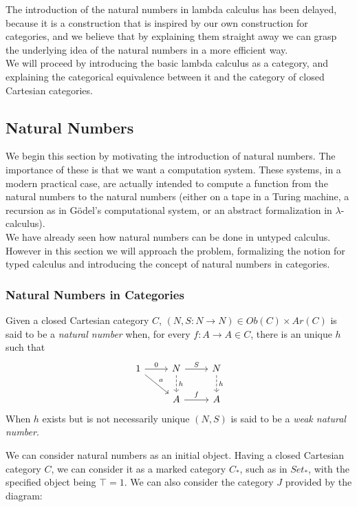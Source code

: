 The introduction of the natural numbers in lambda calculus has been delayed, because it is a construction that is inspired by our own construction for categories, and we believe that by explaining them straight away we can grasp the underlying idea of the natural numbers in a more efficient way.\\

We will proceed by introducing the basic lambda calculus as a category, and explaining the categorical equivalence between it and the category of closed Cartesian categories.

\subsection{Natural Numbers}


We begin this section by motivating the introduction of natural numbers. The importance of these is that we want a computation system. These systems, in a modern practical case, are actually intended to compute a function from the natural numbers to the natural numbers (either on a tape in a Turing machine, a recursion as in Gödel's computational system, or an abstract formalization in $\lambda$-calculus).\\

We have already seen how natural numbers can be done in untyped calculus. However in this section we will approach the problem, formalizing the notion for typed calculus and introducing the concept of natural numbers in categories.

\subsubsection{Natural Numbers in Categories}


\begin{definition}
  Given a closed Cartesian category $C$,  $(N,S:N\to N)\in Ob(C)\times Ar(C)$ is said to be a \emph{natural number} when, for every $f:A\to A\in C$, there is an unique $h$ such that
  \[
    \begin{tikzcd}
      1\arrow{dr}{a}\arrow{r}{0} & N\arrow{r}{S}\arrow[dashed]{d}{h} & N\arrow[dashed]{d}{h}\\
      & A\arrow{r}{f} & A
    \end{tikzcd}
  \]
  When $h$ exists but is not necessarily unique $(N,S)$ is said to be a \emph{weak natural number}.
\end{definition}

We can consider natural numbers as an initial object. Having a closed Cartesian category $C$, we can consider it as a marked category $C_*$, such as in $Set_*$, with the specified object being $\top =1$. We can also consider the category $J$ provided by the diagram:

